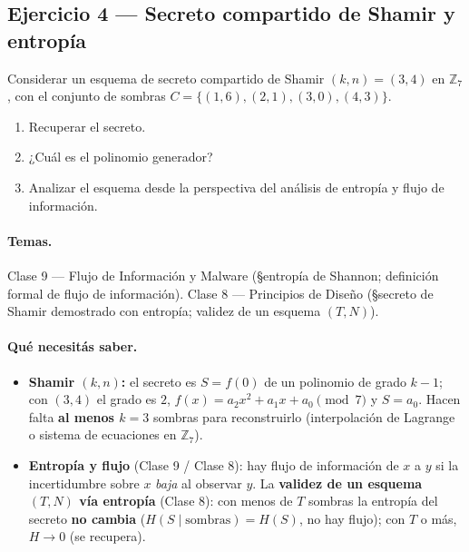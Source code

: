 \subsection{Ejercicio 4 — Secreto compartido de Shamir y entropía}

\begin{consigna}
Considerar un esquema de secreto compartido de Shamir $(k,n)=(3,4)$ en $\mathbb{Z}_7$, con el conjunto de sombras $C=\{(1,6),(2,1),(3,0),(4,3)\}$.

\begin{enumerate}
  \item[a)] Recuperar el secreto.
  \item[b)] ¿Cuál es el polinomio generador?
  \item[c)] Analizar el esquema desde la perspectiva del análisis de entropía y flujo de información.
\end{enumerate}
\end{consigna}

\paragraph{Temas.}
Clase 9 — Flujo de Información y Malware (\S entropía de Shannon; definición formal de flujo de información). Clase 8 — Principios de Diseño (\S secreto de Shamir demostrado con entropía; validez de un esquema $(T,N)$).

\paragraph{Qué necesitás saber.}
\begin{itemize}
  \item \textbf{Shamir $(k,n)$:} el secreto es $S=f(0)$ de un polinomio de grado $k-1$; con $(3,4)$ el grado es $2$, $f(x)=a_2x^2+a_1x+a_0\pmod 7$ y $S=a_0$. Hacen falta \textbf{al menos $k=3$} sombras para reconstruirlo (interpolación de Lagrange o sistema de ecuaciones en $\mathbb{Z}_7$).
  \item \textbf{Entropía y flujo} (Clase 9 / Clase 8): hay flujo de información de $x$ a $y$ si la incertidumbre sobre $x$ \emph{baja} al observar $y$. La \textbf{validez de un esquema $(T,N)$ vía entropía} (Clase 8): con menos de $T$ sombras la entropía del secreto \textbf{no cambia} ($H(S\mid \text{sombras}) = H(S)$, no hay flujo); con $T$ o más, $H\to 0$ (se recupera).
\end{itemize}

